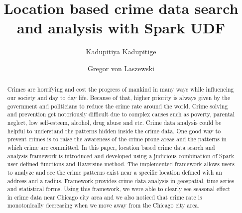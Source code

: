 
\title{Location based crime data search and analysis with Spark UDF}


\author{Kadupitiya Kadupitige}

\author{Gregor von Laszewski}


\renewcommand{\shortauthors}{G. v. Laszewski}


\begin{abstract}
Crimes are horrifying and cost the progress of mankind in many ways
while influencing our society and day to day life. Because of that,
higher priority is always given by the government and politicians to
reduce the crime rate around the world. Crime solving and prevention
get notoriously difficult due to complex causes such as poverty,
parental neglect, low self-esteem, alcohol, drug abuse and etc. Crime
data analysis could be helpful to understand the patterns hidden
inside the crime data. One good way to prevent crimes is to raise the
awareness of the crime prone areas and the patterns in which crime are
committed.  In this paper, location based crime data search and
analysis framework is introduced and developed using a judicious
combination of Spark user defined functions and Haversine method. The
implemented framework allows users to analyze and see the crime
patterns exist near a specific location defined with an address and a
radius. Framework provides crime data analysis in geospatial, time
series and statistical forms. Using this framework, we were able to
clearly see seasonal effect in crime data near Chicago city area and
we also noticed that crime rate is monotonically decreasing when we
move away from the Chicago city area.

\end{abstract}



\maketitle



